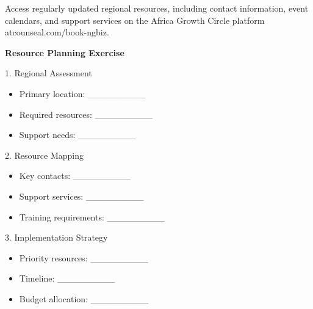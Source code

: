 \vspace{1em}

\begin{communitybox}
    Access regularly updated regional resources, including contact information, event calendars, and support services on the Africa Growth Circle platform atcounseal.com/book-ngbiz.
\end{communitybox}

\vspace{1em}

\begin{workshopbox}
    \textbf{Resource Planning Exercise}

    1. Regional Assessment
    \begin{itemize}[leftmargin=*]
        \item Primary location: \_\_\_\_\_\_\_\_\_
        \item Required resources: \_\_\_\_\_\_\_\_\_
        \item Support needs: \_\_\_\_\_\_\_\_\_
    \end{itemize}

    2. Resource Mapping
    \begin{itemize}[leftmargin=*]
        \item Key contacts: \_\_\_\_\_\_\_\_\_
        \item Support services: \_\_\_\_\_\_\_\_\_
        \item Training requirements: \_\_\_\_\_\_\_\_\_
    \end{itemize}

    3. Implementation Strategy
    \begin{itemize}[leftmargin=*]
        \item Priority resources: \_\_\_\_\_\_\_\_\_
        \item Timeline: \_\_\_\_\_\_\_\_\_
        \item Budget allocation: \_\_\_\_\_\_\_\_\_
    \end{itemize}
\end{workshopbox}